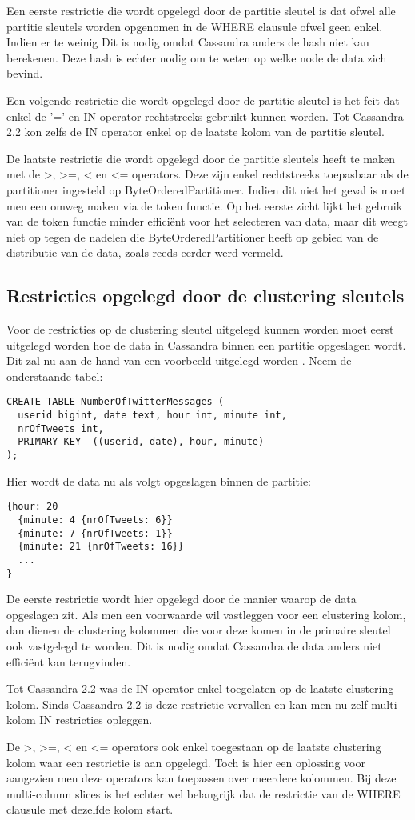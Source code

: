 Een eerste restrictie die wordt opgelegd door de partitie sleutel is dat ofwel alle partitie sleutels worden opgenomen in de WHERE clausule ofwel geen enkel.
Indien er te weinig 
Dit is nodig omdat Cassandra anders de hash niet kan berekenen.
Deze hash is echter nodig om te weten op welke node de data zich bevind.

Een volgende restrictie die wordt opgelegd door de partitie sleutel is het feit dat enkel de '=' en IN operator rechtstreeks gebruikt kunnen worden.
Tot Cassandra 2.2 kon zelfs de IN operator enkel op de laatste kolom van de partitie sleutel.

De laatste restrictie die wordt opgelegd door de partitie sleutels heeft te maken met de >, >=, < en <= operators.
Deze zijn enkel rechtstreeks toepasbaar als de partitioner ingesteld op ByteOrderedPartitioner.
Indien dit niet het geval is moet men een omweg maken via de token functie.
Op het eerste zicht lijkt het gebruik van de token functie minder efficiënt voor het selecteren van data, maar dit weegt niet op tegen de nadelen die ByteOrderedPartitioner heeft op gebied van de distributie van de data, zoals reeds eerder werd vermeld.

\subsection{Restricties opgelegd door de clustering sleutels}
Voor de restricties op de clustering sleutel uitgelegd kunnen worden moet eerst uitgelegd worden hoe de data in Cassandra binnen een partitie opgeslagen wordt.
Dit zal nu aan de hand van een voorbeeld uitgelegd worden \cite{Lerer2015Where}.
Neem de onderstaande tabel:

\begin{lstlisting}
CREATE TABLE NumberOfTwitterMessages (
  userid bigint, date text, hour int, minute int,
  nrOfTweets int,
  PRIMARY KEY  ((userid, date), hour, minute)
);
\end{lstlisting}

Hier wordt de data nu als volgt opgeslagen binnen de partitie: 

\begin{lstlisting}
{hour: 20 
  {minute: 4 {nrOfTweets: 6}} 
  {minute: 7 {nrOfTweets: 1}}
  {minute: 21 {nrOfTweets: 16}}
  ...
}
\end{lstlisting}

De eerste restrictie wordt hier opgelegd door de manier waarop de data opgeslagen zit.
Als men een voorwaarde wil vastleggen voor een clustering kolom, dan dienen de clustering kolommen die voor deze komen in de primaire sleutel ook vastgelegd te worden.
Dit is nodig omdat Cassandra de data anders niet efficiënt kan terugvinden.

Tot Cassandra 2.2 was de IN operator enkel toegelaten op de laatste clustering kolom.
Sinds Cassandra 2.2 is deze restrictie vervallen en kan men nu zelf multi-kolom IN restricties opleggen.

De >, >=, < en <= operators ook enkel toegestaan op de laatste clustering kolom waar een restrictie is aan opgelegd.
Toch is hier een oplossing voor aangezien men deze operators kan toepassen over meerdere kolommen.
Bij deze multi-column slices is het echter wel belangrijk dat de restrictie van de WHERE clausule met dezelfde kolom start.